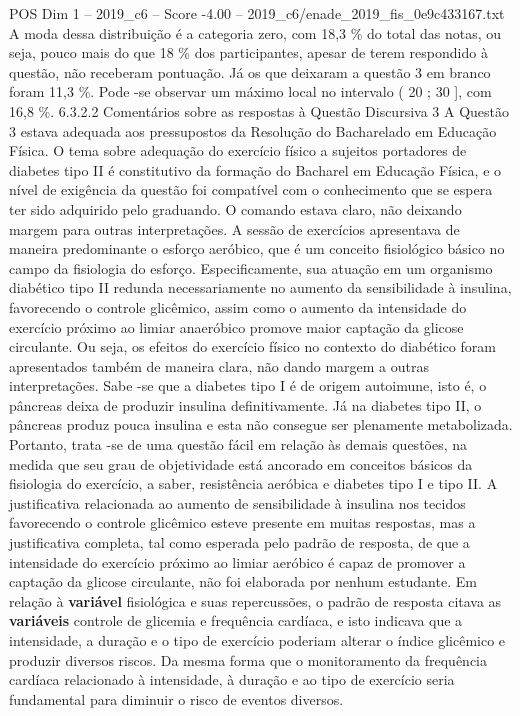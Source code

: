 \begin{textsample}{POS Dim 1 – 2019\_c6 – Score -4.00 – 2019\_c6/enade\_2019\_fis\_0e9c433167.txt}
A moda dessa distribuição é a categoria zero, com 18,3 \% do total das notas, ou seja, pouco mais do que 18 \% dos participantes, apesar de terem respondido à questão, não receberam pontuação.
Já os que deixaram a questão 3 em branco foram 11,3 \%.
Pode -se observar um máximo local no intervalo ( 20 ; 30 ], com 16,8 \%. 6.3.2.2 Comentários sobre as respostas à Questão Discursiva 3 A Questão 3 estava adequada aos pressupostos da Resolução do Bacharelado em Educação Física.
O tema sobre adequação do exercício físico a sujeitos portadores de diabetes tipo II é constitutivo da formação do Bacharel em Educação Física, e o nível de exigência da questão foi compatível com o conhecimento que se espera ter sido adquirido pelo graduando.
O comando estava claro, não deixando margem para outras interpretações.
A sessão de exercícios apresentava de maneira predominante o esforço aeróbico, que é um conceito fisiológico básico no campo da fisiologia do esforço.
Especificamente, sua atuação em um organismo diabético tipo II redunda necessariamente no aumento da sensibilidade à insulina, favorecendo o controle glicêmico, assim como o aumento da intensidade do exercício próximo ao limiar anaeróbico promove maior captação da glicose circulante.
Ou seja, os efeitos do exercício físico no contexto do diabético foram apresentados também de maneira clara, não dando margem a outras interpretações.
Sabe -se que a diabetes tipo I é de origem autoimune, isto é, o pâncreas deixa de produzir insulina definitivamente.
Já na diabetes tipo II, o pâncreas produz pouca insulina e esta não consegue ser plenamente metabolizada.
Portanto, trata -se de uma questão fácil em relação às demais questões, na medida que seu grau de objetividade está ancorado em conceitos básicos da fisiologia do exercício, a saber, resistência aeróbica e diabetes tipo I e tipo II.
A justificativa relacionada ao aumento de sensibilidade à insulina nos tecidos favorecendo o controle glicêmico esteve presente em muitas respostas, mas a justificativa completa, tal como esperada pelo padrão de resposta, de que a intensidade do exercício próximo ao limiar aeróbico é capaz de promover a captação da glicose circulante, não foi elaborada por nenhum estudante.
Em relação à \textbf{variável} fisiológica e suas repercussões, o padrão de resposta citava as \textbf{variáveis} controle de glicemia e frequência cardíaca, e isto indicava que a intensidade, a duração e o tipo de exercício poderiam alterar o índice glicêmico e produzir diversos riscos.
Da mesma forma que o monitoramento da frequência cardíaca relacionado à intensidade, à duração e ao tipo de exercício seria fundamental para diminuir o risco de eventos diversos.

\end{textsample}
